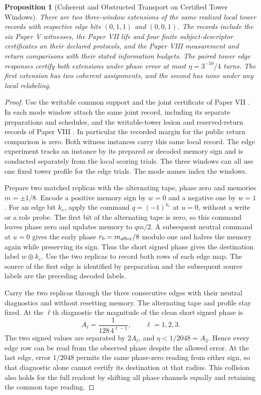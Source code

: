 \documentclass[11pt,a4paper]{article}
\newtheorem{proposition}[theorem]{Proposition}
\theoremstyle{definition}
\begin{document}
\begin{proposition}[Coherent and Obstructed Transport on Certified Tower Windows]\label{prop:bridge-certified-tower-transport}
There are two three-window extensions of the same realized local tower records with respective edge bits $(0,1,1)$ and $(0,0,1)$. The records include the six Paper V witnesses, the Paper VII life and four finite subject-descriptor certificates on their declared protocols, and the Paper VIII measurement and return comparisons with their stated information budgets. The paired tower edge responses certify both extensions under phase error at most $\eta=3^{-10}/4$ turns. The first extension has two coherent assignments, and the second has none under any local relabeling.
\end{proposition}
\begin{proof}
Use the writable common support and the joint certificate of Paper VII \cite{paper5,paper7}. In each mode window attach the same joint record, including its separate preparations and schedules, and the writable-tower lesion and reserved-return records of Paper VIII \cite{paper8}. In particular the recorded margin for the public return comparison is zero. Both witness instances carry this same local record. The edge experiment tracks an instance by its prepared or decoded memory sign and is conducted separately from the local scoring trials. The three windows can all use one fixed tower profile for the edge trials. The mode names index the windows.

Prepare two matched replicas with the alternating tape, phase zero and memories $m=\pm1/8$. Encode a positive memory sign by $w=0$ and a negative one by $w=1$. For an edge bit $k_e$, apply the command $q=(-1)^{k_e}$ at $u=0$, without a write or a role probe. The first bit of the alternating tape is zero, so this command leaves phase zero and updates memory to $q m/2$. A subsequent neutral command at $u=0$ gives the early phase $r_0=m_{\rm after}/8$ modulo one and halves the memory again while preserving its sign. Thus the short signed phase gives the destination label $w\oplus k_e$. Use the two replicas to record both rows of each edge map. The source of the first edge is identified by preparation and the subsequent source labels are the preceding decoded labels.

Carry the two replicas through the three consecutive edges with their neutral diagnostics and without resetting memory. The alternating tape and profile stay fixed. At the $\ell$th diagnostic the magnitude of the clean short signed phase is
\[
 A_\ell=\frac{1}{128\,4^{\ell-1}},\qquad \ell=1,2,3 .
\]
The two signed values are separated by $2A_\ell$, and $\eta<1/2048=A_3$. Hence every edge row can be read from the observed phase despite the allowed error. At the last edge, error $1/2048$ permits the same phase-zero reading from either sign, so that diagnostic alone cannot certify its destination at that radius. This collision also holds for the full readout by shifting all phase channels equally and retaining the common tape reading.


\end{proof}
\end{document}
